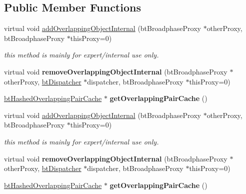 \subsection*{Public Member Functions}
\begin{DoxyCompactItemize}
\item 
\mbox{\label{classbtPairCachingGhostObject_a636e114951f6fdf8a1f5a2b46849a9a7}} 
virtual void \hyperlink{classbtPairCachingGhostObject_a636e114951f6fdf8a1f5a2b46849a9a7}{add\+Overlapping\+Object\+Internal} (bt\+Broadphase\+Proxy $\ast$other\+Proxy, bt\+Broadphase\+Proxy $\ast$this\+Proxy=0)
\begin{DoxyCompactList}\small\item\em this method is mainly for expert/internal use only. \end{DoxyCompactList}\item 
\mbox{\label{classbtPairCachingGhostObject_aa9d4f947633e44d523b89a86c5e3ec38}} 
virtual void {\bfseries remove\+Overlapping\+Object\+Internal} (bt\+Broadphase\+Proxy $\ast$other\+Proxy, \hyperlink{classbtDispatcher}{bt\+Dispatcher} $\ast$dispatcher, bt\+Broadphase\+Proxy $\ast$this\+Proxy=0)
\item 
\mbox{\label{classbtPairCachingGhostObject_abb7e23dcf9e936fb28ce6d90d48c2a55}} 
\hyperlink{classbtHashedOverlappingPairCache}{bt\+Hashed\+Overlapping\+Pair\+Cache} $\ast$ {\bfseries get\+Overlapping\+Pair\+Cache} ()
\item 
\mbox{\label{classbtPairCachingGhostObject_a6b8b32d129d4715a65679be7d8e84342}} 
virtual void \hyperlink{classbtPairCachingGhostObject_a6b8b32d129d4715a65679be7d8e84342}{add\+Overlapping\+Object\+Internal} (bt\+Broadphase\+Proxy $\ast$other\+Proxy, bt\+Broadphase\+Proxy $\ast$this\+Proxy=0)
\begin{DoxyCompactList}\small\item\em this method is mainly for expert/internal use only. \end{DoxyCompactList}\item 
\mbox{\label{classbtPairCachingGhostObject_ad642085bd940a088467a9649a3ff58e5}} 
virtual void {\bfseries remove\+Overlapping\+Object\+Internal} (bt\+Broadphase\+Proxy $\ast$other\+Proxy, \hyperlink{classbtDispatcher}{bt\+Dispatcher} $\ast$dispatcher, bt\+Broadphase\+Proxy $\ast$this\+Proxy=0)
\item 
\mbox{\label{classbtPairCachingGhostObject_abb7e23dcf9e936fb28ce6d90d48c2a55}} 
\hyperlink{classbtHashedOverlappingPairCache}{bt\+Hashed\+Overlapping\+Pair\+Cache} $\ast$ {\bfseries get\+Overlapping\+Pair\+Cache} ()
\end{DoxyCompactItemize}


